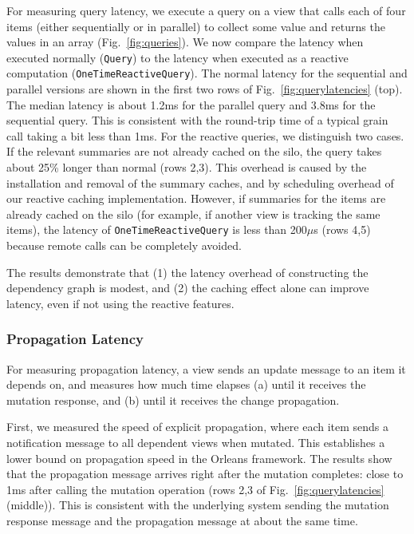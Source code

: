 For measuring query latency, we execute a query on a view that calls each of four items (either sequentially or in parallel) to collect some value and returns the values in an array (Fig.~\ref{fig:queries}). We now compare the latency when executed normally (\lstinline|Query|) to the latency when executed as a reactive computation (\lstinline|OneTimeReactiveQuery|). The normal latency for the sequential and parallel versions are shown in the first two rows of Fig.~\ref{fig:querylatencies} (top). The median latency is about 1.2ms for the parallel query and 3.8ms for the sequential query. This is consistent with the round-trip time of a typical grain call taking a bit less than 1ms. For the reactive queries, we distinguish two cases. If  the relevant summaries are not already cached on the silo, the query takes about 25\% longer than normal (rows 2,3). This overhead is caused by the installation and removal of the summary caches, and by scheduling overhead of our reactive caching implementation. However, if summaries for the items are already cached on the silo (for example, if another view is tracking the same items), the latency of \lstinline|OneTimeReactiveQuery| is less than 200$\mu$s (rows 4,5) because remote calls can be completely avoided. 

 The results demonstrate that (1) the latency overhead of constructing the dependency graph is modest, and (2)  the caching effect alone can improve latency, even if not using the reactive features.

\subsubsection{Propagation Latency}

For measuring propagation latency, a view sends an update message to an item it depends on, and measures how much time elapses (a) until it receives the mutation response, and (b) until it receives the change propagation. 

First, we measured the speed of explicit propagation, where each item sends a notification message to all dependent views when mutated. This establishes a lower bound on propagation speed in the Orleans framework. The results show that the propagation message arrives right after the mutation completes: close to 1ms after calling the mutation operation (rows 2,3 of Fig.~\ref{fig:querylatencies} (middle)). This is consistent with the underlying system sending the mutation response message and the propagation message at about the same time. 

